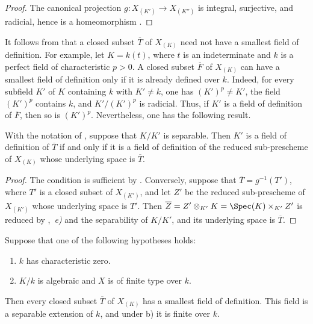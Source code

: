 \begin{proof}
The canonical projection $g:X_{(K')}\longrightarrow X_{(K'')}$
is integral, surjective, and radicial, hence is a homeomorphism
.
\end{proof}

\begin{remark}[4.9.3]
\label{IV.4.9.3}
It follows from  that a closed subset
$\overline T$ of $X_{(K)}$ need not have a smallest field of
definition.
For example, let $K=k(t)$, where $t$ is an indeterminate and $k$ is
a perfect field of characteristic $p>0$.
A closed subset $\overline F$ of $X_{(K)}$ can have a smallest field
of definition only if it is already defined over $k$.
Indeed, for every subfield $K'$ of $K$ containing $k$ with
$K'\ne k$, one has $(K')^p\ne K'$, the field $(K')^p$ contains $k$,
and $K'/(K')^p$ is radicial.
Thus, if $K'$ is a field of definition of $\overline F$, then so is
$(K')^p$.
Nevertheless, one has the following result.
\end{remark}


\begin{proposition}[4.9.4]
\label{IV.4.9.4}
With the notation of , suppose that $K/K'$ is
separable.
Then $K'$ is a field of definition of $\overline T$ if and only if
it is a field of definition of the reduced sub-prescheme of
$X_{(K)}$ whose underlying space is $\overline T$.
\end{proposition}

\begin{proof}
The condition is sufficient by .
Conversely, suppose that
$\overline T=g^{-1}(T')$, where $T'$ is a closed subset of
$X_{(K')}$, and let $Z'$ be the reduced sub-prescheme of $X_{(K')}$
whose underlying space is $T'$.
Then $\overline Z=Z'\otimes_{K'}K=\Spec(K)\times_{K'}Z'$
is reduced by ,~\emph{e)} and the separability of $K/K'$,
and its underlying space is $\overline T$.
\end{proof}

\begin{corollary}[4.9.5]
\label{IV.4.9.5}
Suppose that one of the following hypotheses holds:
\begin{enumerate}
\item[\rm(a)]
\label{IV.4.9.5.a}
$k$ has characteristic zero.
\item[\rm(b)]
\label{IV.4.9.5.b}
$K/k$ is algebraic and $X$ is of finite type over $k$.
\end{enumerate}
Then every closed subset $\overline T$ of $X_{(K)}$ has a smallest
field of definition.
This field is a separable extension of $k$, and under
\textup{b)} it is finite over $k$.
\end{corollary}

